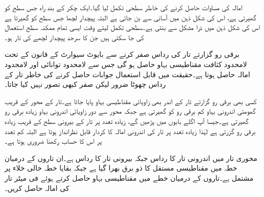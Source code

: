 امالہ کی مساوات حاصل کرنے کی خاطر سطحی تکمل لیا گیا۔ایک چکر کے بند راہ جس سطح کو گھیرتی ہے، اس کی شکل ذہن میں آسانی سے بن جاتی ہے البتہ پیچدار لچھا جس سطح کو گھیرتا ہے اس کی شکل ذہن میں ذرا مشکل سے بنتی ہے۔سطحی تکمل لیتے وقت ایسی تمام ممکنہ سطح استعمال کی جا سکتی ہیں جن کا سرحد پیچدار لچھے کی تار ہو۔

برقی رو گزارتے تار کی رداس صفر کرنے سے بایوٹ سیوارٹ کے قانون کے تحت لامحدود کثافت مقناطیسی بہاو حاصل ہو گی جس سے لامحدود توانائی اور لامحدود امالہ حاصل ہوتا ہے۔حقیقت میں قابل استعمال جوابات حاصل کرنے کی خاطر تار کے رداس  چھوٹا ضرور لیکن صفر کبھی تصور نہیں کیا جاتا۔

کسی بھی برقی رو گزارتے تار کے اندر بھی زاویائی مقناطیسی بہاو پایا جاتا ہے۔تار کے محور کے قریب  گھومتی اندرونی بہاو کم برقی رو کو گھیرتی ہے جبکہ محور سے دور زاویائی اندرونی بہاو زیادہ برقی رو گھیرتی ہے۔جیسا آپ اگلے بابوں میں پڑھیں گے، زیادہ تعدد پر تار کے بیرونی سطح کے قریب زیادہ برقی رو گزرتی ہے لہٰذا زیادہ تعدد پر تار کی اندرونی امالہ کا کردار قابل نظرانداز ہوتا ہے البتہ کم تعدد پر اس کا حساب رکھنا ضروری ہوتا ہے۔

محوری تار میں اندرونی تار کا رداس  جبکہ بیرونی تار کا رداس  ہے۔ان تاروں کے درمیان خطہ  میں  مقناطیسی مستقل کا ذو برق بھرا گیا ہے جبکہ بقایا خطہ خالی خلاء پر مشتمل ہے۔تاروں کے درمیان خطے میں مقناطیسی بہاو حاصل کرتے ہوئے فی میٹر تار کی امالہ حاصل کریں۔

